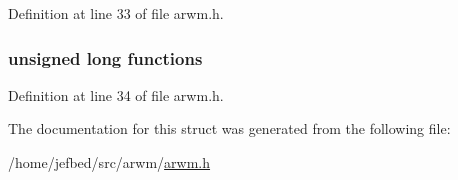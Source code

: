Definition at line 33 of file arwm.h.

\hypertarget{struct_prop_mwm_hints_a76dd892f687b605e187bc7b1b8c73fe0}{
\subsubsection[{functions}]{\setlength{\rightskip}{0pt plus 5cm}unsigned long {\bf functions}}}
\label{struct_prop_mwm_hints_a76dd892f687b605e187bc7b1b8c73fe0}


Definition at line 34 of file arwm.h.



The documentation for this struct was generated from the following file:\begin{DoxyCompactItemize}
\item 
/home/jefbed/src/arwm/\hyperlink{arwm_8h}{arwm.h}\end{DoxyCompactItemize}
